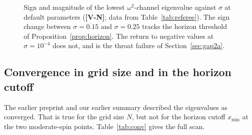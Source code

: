 \documentclass[11pt, a4paper]{article}
\newcommand{\VN}{\textcolor{vn}{\textbf{[V-N]}}}
\theoremstyle{remark}
\theoremstyle{definition}
\begin{document}
\begin{figure}[H]
\centering
{}
\caption{Sign and magnitude of the lowest $\omega^2$-channel eigenvalue against $\sigma$ at default parameters (\VN; data from Table~\ref{tab:referee}). The sign change between $\sigma = 0.15$ and $\sigma = 0.25$ tracks the horizon threshold of Proposition~\ref{prop:horizon}. The return to negative values at $\sigma = 10^{-4}$ does not, and is the throat failure of Section~\ref{sec:gap2a}.}
\label{fig:eig}
\end{figure}

\subsection{Convergence in grid size and in the horizon cutoff}

The earlier preprint and our earlier summary described the eigenvalues as converged. That is true for the grid size $N$, but not for the horizon cutoff $x_{\min}$ at the two moderate-spin points. Table~\ref{tab:conv} gives the full scan.
\end{document}

